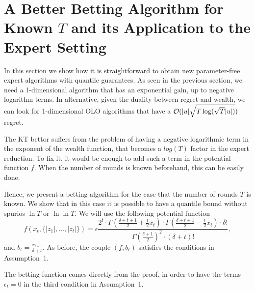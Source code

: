 \section{A Better Betting Algorithm for Known $T$ and its Application to the Expert Setting}

In this section we show how it is straightforward to obtain new parameter-free expert algorithms with quantile guarantees.
As seen in the previous section, we need a 1-dimensional algorithm that has an exponential gain, up to negative logarithm terms. In alternative, given the duality between regret and wealth, we can look for 1-dimensional \ac{OLO} algorithms that have a $\mathcal{O}(|u|\sqrt{T \log(\sqrt{T} |u|)})$ regret.

The \ac{KT} bettor suffers from the problem of having a negative logarithmic term in the exponent of the wealth function, that becomes a $log(T)$ factor in the expert reduction.
To fix it, it would be enough to add such a term in the potential function $f$. When the number of rounds is known beforehand, this can be easily done.

Hence, we present a betting algorithm for the case that the number of rounds $T$ is known. We show that in this case it is possible to have a quantile bound without spurios $\ln T$ or $\ln \ln T$.
We will use the following potential function
\begin{equation}
\label{eq:kt_new_potential}
f\left( x_{t}, \{|z_1|, \ldots, |z_{t}|\}\right) 
= \epsilon  \frac{2^{t} \cdot \Gamma \left(\frac{\delta+t+1}{2} + \frac{1}{2} x_{t} \right) \cdot \Gamma \left(\frac{\delta+t+1}{2} - \frac{1}{2} x_{t} \right) \cdot \delta!}{ \Gamma(\frac{\delta+1}{2})^2 \cdot (\delta+t)!}, 
\end{equation}
and $b_t= \frac{x_{t-1}}{\delta+t}$.
As before, the couple $(f,b_t)$ satisfies the conditions in Assumption~1.

The betting function comes directly from the proof, in order to have the terms $\epsilon_t=0$ in the third condition in Assumption~1.


